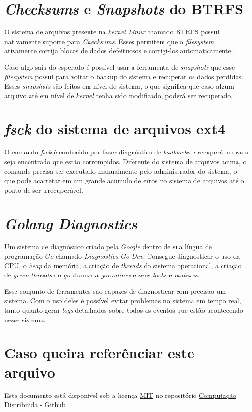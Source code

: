 \section*{\emph{Checksums} e \emph{Snapshots} do BTRFS}

O sistema de arquivos presente na \emph{kernel Linux} chamado BTRFS possui nativamente
suporte para \emph{Checksums}. Esses permitem que o \emph{filesystem} ativamente corrija
blocos de dados defeituosos e corrigi-los automaticamente.

Caso algo saia do esperado é possível usar a ferramenta de \emph{snapshots} que esse \emph{filesystem}
possui para voltar o backup do sistema e recuperar os dados perdidos. Esses \emph{snapshots} são
feitos em nível de sistema, o que significa que caso algum arquivo até em nível de \emph{kernel} tenha sido
modificado, poderá ser recuperado.

\section*{\emph{fsck} do sistema de arquivos ext4}

O comando \emph{fsck} é conhecido por fazer diagnóstico de \emph{badblocks} e recuperá-los 
caso seja encontrado que estão corrompidos. Diferente do sistema de arquivos acima, o comando
precisa ser executado manualmente pelo administrador do sistema, o que pode acarretar em um grande acumulo
de erros no sistema de arquivos até o ponto de ser irrecuperável.

\section*{\emph{Golang Diagnostics}}

Um sistema de diagnóstico criado pela \emph{Google} dentro de sua língua de programação \emph{Go} chamado
\href{https://go.dev/doc/diagnostics}{\emph{Diagnostics Go Dev}}. Consegue diagnosticar o uso da CPU, 
o \emph{heap} da memória, a criação de \emph{threads} do sistema operacional, a criação de \emph{green threads}
do \emph{go} chamada \emph{goroutines} e seus \emph{locks} e \emph{mutexes}.

Esse conjunto de ferramentes são capazes de diagnosticar com precisão um sistema. Com o uso deles é possível
evitar problemas no sistema em tempo real, tanto quanto gerar \emph{logs} detalhados sobre todos os eventos 
que estão acontecendo nesse sistema.


\section*{Caso queira referênciar este arquivo}

Este documento está disponível sob a licença \href{https://choosealicense.com/licenses/mit/}{MIT} no repositório
\href{https://github.com/Trees-Over-The-Lake/Computacao-Distribuida}{Computação Distribuída - Github}